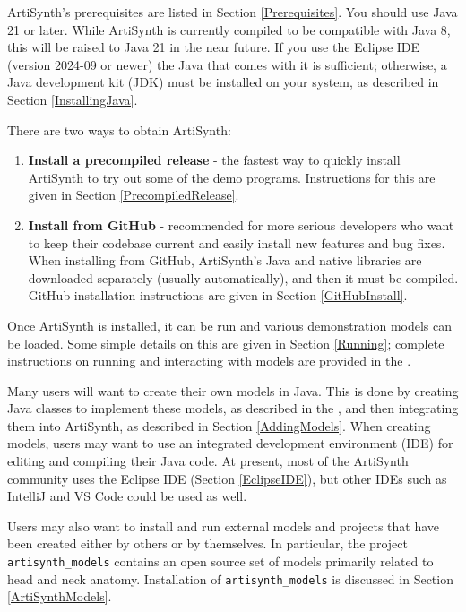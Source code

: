 ArtiSynth's prerequisites are listed in Section \ref{Prerequisites}.
You should use Java 21 or later. While ArtiSynth is currently
compiled to be compatible with Java 8, this will be raised to Java 21
in the near future.  If you use the Eclipse IDE (version 2024-09 or
newer) the Java that comes with it is sufficient;
otherwise, a Java development kit (JDK) must be installed on your
system, as described in Section \ref{InstallingJava}.

There are two ways to obtain ArtiSynth:

\begin{enumerate}

\item {\bf Install a precompiled release} - the
fastest way to quickly install ArtiSynth to try out some of the demo
programs. Instructions for this are given in Section 
\ref{PrecompiledRelease}.

\item {\bf Install from GitHub} - recommended
for more serious developers who want to keep their codebase current
and easily install new features and bug fixes. When installing from
GitHub, ArtiSynth's Java and native libraries are downloaded
separately (usually automatically), and then it must be compiled.
GitHub installation instructions are given in Section
\ref{GitHubInstall}.

\end{enumerate}

Once ArtiSynth is installed, it can be run and various demonstration
models can be loaded. Some simple details on this are given in
Section \ref{Running}; complete instructions on running and
interacting with models are provided in
the .

Many users will want to create their own models in Java. This is done
by creating Java classes to implement these models, as described in
the , and then
integrating them into ArtiSynth, as described in
Section \ref{AddingModels}.  When creating models, users may want to
use an integrated development environment (IDE) for editing and
compiling their Java code.  At present, most of the ArtiSynth
community uses the Eclipse IDE (Section \ref{EclipseIDE}), but other
IDEs such as IntelliJ and VS Code could be used as well.

Users may also want to install and run external models and projects
that have been created either by others or by themselves.  In
particular, the project {\tt artisynth\_models} contains an
open source set of models primarily related to head and neck
anatomy. Installation of {\tt artisynth\_models} is discussed in
Section \ref{ArtiSynthModels}.

